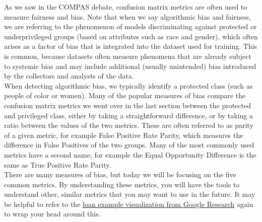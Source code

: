 \documentclass[assignment03_Solutions]{subfiles}
\begin{document}
As we saw in the COMPAS debate, confusion matrix metrics are often used to measure fairness and bias. Note that when we say algorithmic bias and fairness, we are referring to the phenomenon of models discriminating against protected or underprivileged groups (based on attributes such as race and gender), which often arises as a factor of bias that is integrated into the dataset used for training. This is common, because datasets often measure phenomena that are already subject to systemic bias and may include additional (usually unintended) bias introduced by the collectors and analysts of the data.\\ 
When detecting algorithmic bias, we typically identify a protected class (such as people of color or women). Many of the popular measures of bias compare the confusion matrix metrics we went over in the last section between the protected and privileged class, either by taking a straightforward difference, or by taking a ratio between the values of the two metrics. These are often referred to as parity of a given metric, for example False Positive Rate Parity, which measures the difference in False Positives of the two groups. Many of the most commonly used metrics have a second name, for example the Equal Opportunity Difference is the same as True Positive Rate Parity.\\
There are many measures of bias, but today we will be focusing on the five common metrics. By understanding these metrics, you will have the tools to understand other, similar metrics that you may want to use in the future. It may be helpful to refer to the \href{http://research.google.com/bigpicture/attacking-discrimination-in-ml/}{loan example visualization from Google Research} again to wrap your head around this.
\end{document}

